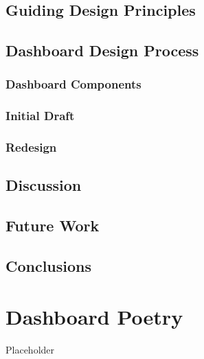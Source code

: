 \documentclass[print]{nuthesis}
\begin{document}
\hypertarget{guiding-design-principles}{%
\section{Guiding Design Principles}\label{guiding-design-principles}}

\hypertarget{dashboard-design-process}{%
\section{Dashboard Design Process}\label{dashboard-design-process}}

\hypertarget{dashboard-components}{%
\subsection{Dashboard Components}\label{dashboard-components}}

\hypertarget{initial-draft}{%
\subsection{Initial Draft}\label{initial-draft}}

\hypertarget{redesign}{%
\subsection{Redesign}\label{redesign}}

\hypertarget{discussion}{%
\section{Discussion}\label{discussion}}

\hypertarget{future-work}{%
\section{Future Work}\label{future-work}}

\hypertarget{conclusions}{%
\section{Conclusions}\label{conclusions}}

\hypertarget{math-sci}{%
\chapter{Dashboard Poetry}\label{math-sci}}

Placeholder
\end{document}
